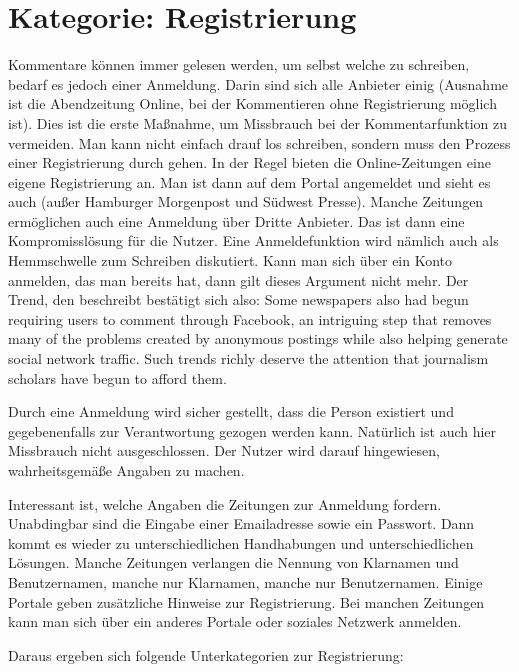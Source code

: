 

\section{Kategorie: \glqq Registrierung\grqq}

Kommentare können immer gelesen werden, um selbst welche zu schreiben, bedarf es
jedoch einer Anmeldung. Darin sind sich alle Anbieter einig (Ausnahme ist die Abendzeitung
Online, bei der Kommentieren ohne Registrierung möglich ist). Dies ist die erste
Maßnahme, um Missbrauch bei der Kommentarfunktion zu vermeiden. Man kann nicht
einfach drauf los schreiben, sondern muss den Prozess einer Registrierung durch
gehen. In der Regel bieten die Online-Zeitungen eine eigene Registrierung an.
Man ist dann auf dem Portal angemeldet und sieht es auch (außer Hamburger
Morgenpost und Südwest Presse). Manche Zeitungen ermöglichen auch eine Anmeldung
über Dritte Anbieter. Das ist dann eine Kompromisslösung für die Nutzer. Eine
Anmeldefunktion wird nämlich auch als Hemmschwelle zum Schreiben diskutiert.
Kann man sich über ein Konto anmelden, das man bereits hat, dann gilt dieses
Argument nicht mehr. Der Trend, den \textcite[S.~69]{singer:2014} beschreibt
bestätigt sich also: \glqq Some newspapers also had begun requiring users to
comment through Facebook, an intriguing step that removes many of the problems
created by anonymous postings while also helping generate social network
traffic. Such trends richly deserve the attention that journalism scholars have
begun to afford them.\grqq

Durch eine Anmeldung wird sicher gestellt, dass die Person existiert und
gegebenenfalls zur Verantwortung gezogen werden kann.  Natürlich ist auch hier
Missbrauch nicht ausgeschlossen. Der Nutzer wird darauf hingewiesen,
wahrheitsgemäße Angaben zu machen. 

Interessant ist, welche Angaben die Zeitungen zur Anmeldung fordern. Unabdingbar
sind die Eingabe einer Emailadresse sowie ein Passwort. Dann kommt es wieder zu
unterschiedlichen Handhabungen und unterschiedlichen Lösungen. Manche Zeitungen
verlangen die Nennung von Klarnamen und Benutzernamen, manche nur Klarnamen,
manche nur Benutzernamen. Einige Portale geben zusätzliche Hinweise zur
Registrierung. Bei manchen Zeitungen kann man sich über ein anderes Portale oder
soziales Netzwerk anmelden.

Daraus ergeben sich folgende Unterkategorien zur Registrierung:

